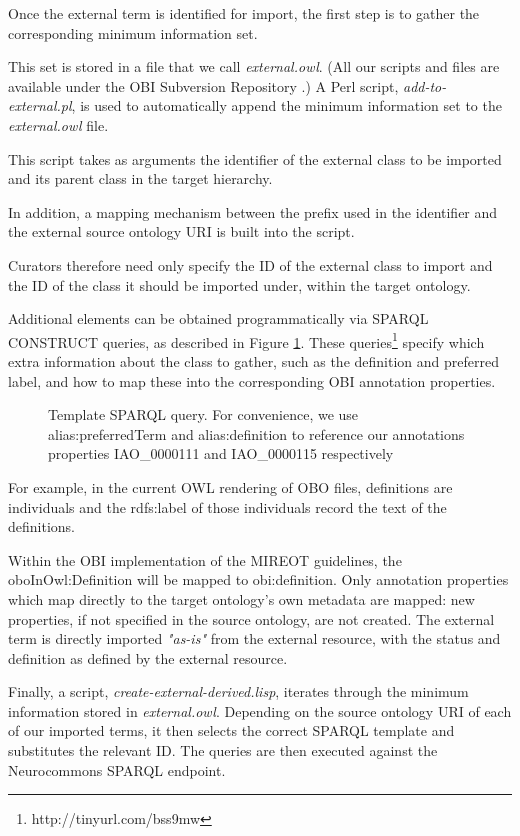 \documentclass{ao2e}%
\begin{document}
Once the external term is identified for import, the first step is to gather the corresponding minimum information set.

This set is stored in a file that we call \emph{external.owl}. (All our scripts and files are available under the \ac{OBI} Subversion Repository \cite{OBIScripts}.)
A Perl script, \emph{add-to-external.pl}, is used to automatically append the minimum information set to the \emph{external.owl} file. 

This script takes as arguments the identifier of the external class to be imported and its parent class in the target hierarchy.

In addition, a mapping mechanism between the prefix used in the identifier and the external source ontology URI is built into the script.

Curators therefore need only specify the ID of the external class to import and the ID of the class it should be imported under, within the target ontology.


Additional elements can be obtained programmatically via SPARQL\cite{SPARQL} CONSTRUCT queries, as described in Figure \ref{fig:sparql}.
These queries\footnote{http://tinyurl.com/bss9mw} specify which extra information about the class to gather, such as the definition and preferred label, and how to map these into the corresponding OBI annotation properties. 

\begin{figure}[t]
\scriptsize
 
\caption{Template SPARQL query. For convenience, we use alias:preferredTerm and
alias:definition to reference our annotations properties IAO\_0000111 and IAO\_0000115 \cite{IAO} respectively}
\label{fig:sparql}
\end{figure}


For example, in the current \ac{OWL} rendering of \ac{OBO} files, definitions are individuals and the rdfs:label of those individuals record the text of the definitions. 

Within the \ac{OBI} implementation of the \ac{MIREOT} guidelines, the oboInOwl:Definition will be mapped to obi:definition. Only annotation properties which map directly to the target ontology's own metadata are mapped: new properties, if not specified in the source ontology, are not created. The external term is directly imported \emph{"as-is"} from the external resource, with the status and definition as defined by the external resource.

Finally, a script, \emph{create-external-derived.lisp}, iterates through the minimum information stored in \emph{external.owl}.
Depending on the source ontology URI of each of our imported terms, it then selects the correct SPARQL template and substitutes the relevant ID.
The queries are then executed against the Neurocommons SPARQL endpoint\cite{Neurocommons}.
\end{document}
